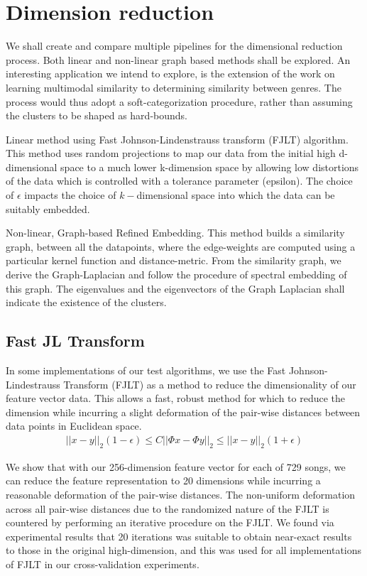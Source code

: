 \documentclass[10pt]{article}
\begin{document}
\section{Dimension reduction}
We shall create and compare multiple pipelines for the dimensional reduction process. Both linear and non-linear graph based methods shall be explored. An interesting application we intend to explore, is the extension of the work on learning multimodal similarity \cite{multimodalSimilarity} to determining similarity between genres. The process would thus adopt a soft-categorization procedure, rather than assuming the clusters to be shaped as hard-bounds.

Linear method using Fast Johnson-Lindenstrauss transform (FJLT) algorithm.  This method uses random projections to map our data from the initial high d-dimensional space to a much lower k-dimension space by allowing low distortions of the data which is controlled with a tolerance parameter (epsilon). The choice of $\epsilon$ impacts the choice of $k-$dimensional space into which the data can be suitably embedded.

Non-linear, Graph-based Refined Embedding. This method builds a similarity graph, between all the datapoints, where the edge-weights are computed using a particular kernel function and distance-metric. From the similarity graph, we derive the Graph-Laplacian and follow the procedure of spectral embedding of this graph. The eigenvalues and the eigenvectors of the Graph Laplacian shall indicate the existence of the clusters. 


\subsection{Fast JL Transform}
In some implementations of our test algorithms, we use the Fast Johnson-Lindestrauss Transform (FJLT)\cite{fjltAlgo} as a method to reduce the dimensionality of our feature vector data.  This allows a fast, robust method for which to reduce the dimension while incurring a slight deformation of the pair-wise distances between data points in Euclidean space.
\begin{align*}
||x-y||_2 (1-\epsilon) \leq C ||\Phi x - \Phi y ||_2 \leq ||x-y||_2 (1 + \epsilon)
\end{align*}

We show that with our 256-dimension feature vector for each of 729 songs, we can reduce the feature representation to 20 dimensions while incurring a reasonable deformation of the pair-wise distances.  The non-uniform deformation across all pair-wise distances due to the randomized nature of the FJLT is countered by performing an iterative procedure on the FJLT.  We found via experimental results that 20 iterations was suitable to obtain near-exact results to those in the original high-dimension, and this was used for all implementations of FJLT in our cross-validation experiments.
\end{document}
